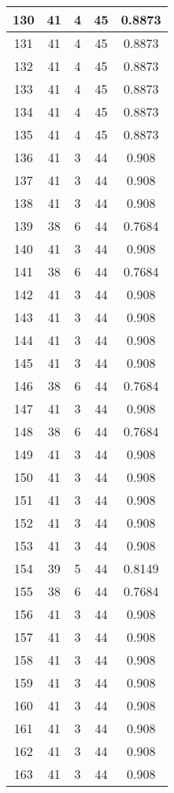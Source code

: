 \documentclass[letterpaper, 12pt]{article}
\begin{document}
\begin{longtable}{|c|c|c|c|c|}
\hline
130 & 41 & 4 & 45 & 0.8873 \\
\hline
131 & 41 & 4 & 45 & 0.8873 \\
\hline
132 & 41 & 4 & 45 & 0.8873 \\
\hline
133 & 41 & 4 & 45 & 0.8873 \\
\hline
134 & 41 & 4 & 45 & 0.8873 \\
\hline
135 & 41 & 4 & 45 & 0.8873 \\
\hline
136 & 41 & 3 & 44 & 0.908 \\
\hline
137 & 41 & 3 & 44 & 0.908 \\
\hline
138 & 41 & 3 & 44 & 0.908 \\
\hline
139 & 38 & 6 & 44 & 0.7684 \\
\hline
140 & 41 & 3 & 44 & 0.908 \\
\hline
141 & 38 & 6 & 44 & 0.7684 \\
\hline
142 & 41 & 3 & 44 & 0.908 \\
\hline
143 & 41 & 3 & 44 & 0.908 \\
\hline
144 & 41 & 3 & 44 & 0.908 \\
\hline
145 & 41 & 3 & 44 & 0.908 \\
\hline
146 & 38 & 6 & 44 & 0.7684 \\
\hline
147 & 41 & 3 & 44 & 0.908 \\
\hline
148 & 38 & 6 & 44 & 0.7684 \\
\hline
149 & 41 & 3 & 44 & 0.908 \\
\hline
150 & 41 & 3 & 44 & 0.908 \\
\hline
151 & 41 & 3 & 44 & 0.908 \\
\hline
152 & 41 & 3 & 44 & 0.908 \\
\hline
153 & 41 & 3 & 44 & 0.908 \\
\hline
154 & 39 & 5 & 44 & 0.8149 \\
\hline
155 & 38 & 6 & 44 & 0.7684 \\
\hline
156 & 41 & 3 & 44 & 0.908 \\
\hline
157 & 41 & 3 & 44 & 0.908 \\
\hline
158 & 41 & 3 & 44 & 0.908 \\
\hline
159 & 41 & 3 & 44 & 0.908 \\
\hline
160 & 41 & 3 & 44 & 0.908 \\
\hline
161 & 41 & 3 & 44 & 0.908 \\
\hline
162 & 41 & 3 & 44 & 0.908 \\
\hline
163 & 41 & 3 & 44 & 0.908 \\
\hline

\end{longtable}
\end{document}
